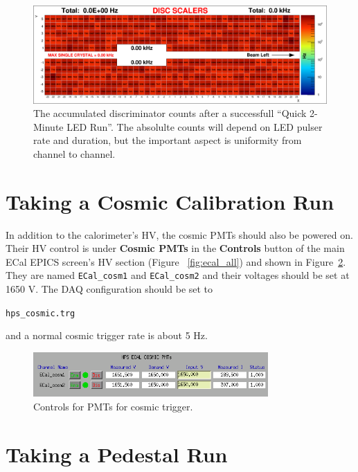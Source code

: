 \documentclass[12pt]{article}
\begin{document}
  \begin{figure}[htbp]\centering
      \includegraphics[width=14cm]{pics/ledScanBlue_2015_04_17_10-45-53.png}
      \caption{The accumulated discriminator counts after a successfull ``Quick 2-Minute LED Run''.  The absolulte counts will depend on LED pulser rate and duration, but the important aspect is uniformity from channel to channel.  \label{fig:quickledscanresult}}
  \end{figure}


   \section{Taking a Cosmic Calibration Run}

   In addition to the calorimeter's HV, the cosmic PMTs should also be powered on.  Their HV control is under {\bf Cosmic PMTs} in the {\bf Controls} button of the main ECal EPICS screen's HV section (Figure ~\ref{fig:ecal_all}) and shown in Figure~\ref{fig:cosmicPMTs}.  They are named \texttt{ECal\_cosm1} and \texttt{ECal\_cosm2} and their voltages should be set at 1650 V.  The DAQ configuration should be set to \begin{center}\texttt{hps\_cosmic.trg}\end{center} and a normal cosmic trigger rate is about 5 Hz.
       \begin{figure}[htbp]\centering
           \includegraphics[width=0.8\textwidth]{pics/cosmicPMTs.png}
           \caption{Controls for PMTs for cosmic trigger.\label{fig:cosmicPMTs}}
       \end{figure}


   \section{Taking a Pedestal Run}
\end{document}
